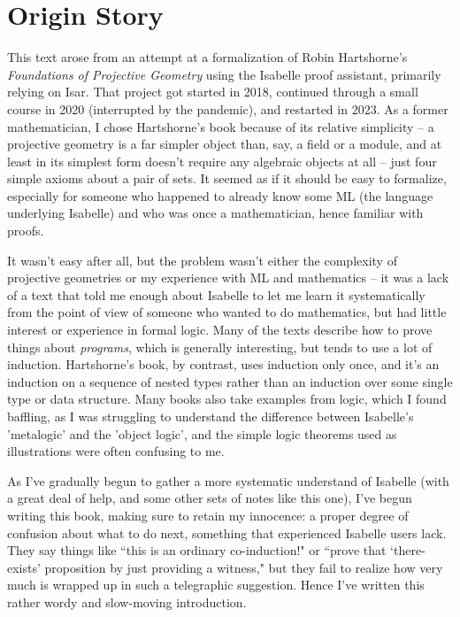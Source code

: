 \chapter*{Origin Story}
This text arose from an attempt at a formalization of Robin Hartshorne's \emph{Foundations of Projective Geometry}
using the Isabelle proof assistant, primarily relying on Isar. That project got started in 2018, continued through a small course in 2020 (interrupted by the pandemic), and restarted in 2023. As a former mathematician, I chose Hartshorne's book because of its relative simplicity -- a projective geometry is a far simpler object than, say, a field or a module, and at least in its simplest form doesn't require any algebraic objects at all -- just four simple axioms about a pair of sets. It seemed as if it should be easy to formalize, especially for someone who happened to already know some ML (the language underlying Isabelle) and who was once a mathematician, hence familiar with proofs. 

It wasn't easy after all, but the problem wasn't either the complexity of projective geometries or my experience with ML and mathematics -- it was a lack of a text that told me enough about Isabelle to let me learn it systematically from the point of view of someone who wanted to do mathematics, but had little interest or experience in formal logic. Many of the texts describe how to prove things about \textit{programs}, which is generally interesting, but tends to use a lot of induction. Hartshorne's book, by contrast, uses induction only once, and it's an induction on a sequence of nested types rather than an induction over some single type or data structure. Many books also take examples from logic, which I found baffling, as I was struggling to understand the difference between Isabelle's 'metalogic' and the 'object logic', and the simple logic theorems used as illustrations were often confusing to me. 

As I've gradually begun to gather a more systematic understand of Isabelle (with a great deal of help, and some other sets of notes like this one), I've begun writing this book, making sure to retain my innocence: a proper degree of confusion about what to do next, something that experienced Isabelle users lack. They say things like ``this is an ordinary co-induction!" or ``prove that `there-exists' proposition by just providing a witness," but they fail to realize how very much is wrapped up in such a telegraphic suggestion. Hence I've written this rather wordy and slow-moving introduction. 
